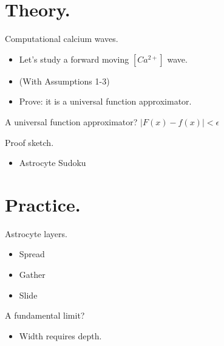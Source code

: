 \documentclass[10pt]{beamer}
\begin{document}
\section[In theory.]{Theory.}
\begin{frame}[fragile]{Computational calcium waves.}
\begin{itemize}
\item Let's study a forward moving $[Ca^{2+}]$ wave.
\item (With Assumptions 1-3)
\item \alert{Prove}: it is a universal function approximator.
\end{itemize}
\end{frame}

\begin{frame}[fragile]{A universal function approximator?}
$|F(x) - f(x)| < \epsilon$
\end{frame}

\begin{frame}[fragile]{Proof sketch.}
\begin{itemize}
\item Astrocyte Sudoku
\end{itemize}
\end{frame}

\section[In practice.]{Practice.}
\begin{frame}[fragile]{Astrocyte layers.}
\begin{itemize}
    \item Spread
    \item Gather
    \item Slide
\end{itemize}
\end{frame}

\begin{frame}[fragile]{A fundamental limit?}
\begin{itemize}
\item Width requires depth.
\end{itemize}
\end{frame}
\end{document}
